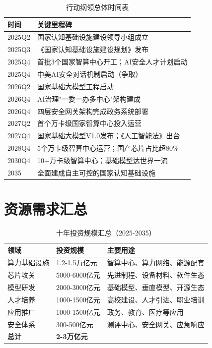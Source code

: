 \begin{table}[H]
\centering
\caption{行动纲领总体时间表}
\small
\begin{tabular}{p{2cm}p{10cm}}
\toprule
\textbf{时间} & \textbf{关键里程碑} \\
\midrule
2025Q2 & 国家认知基础设施建设领导小组成立 \\
2025Q3 & 《国家认知基础设施建设规划》发布 \\
2025Q4 & 首批3个国家智算中心开工；AI安全人才计划启动 \\
2025Q4 & 中美AI安全对话机制启动（争取） \\
2026Q2 & 国家基础大模型工程启动 \\
2026Q4 & AI治理"一委一办多中心"架构建成 \\
2026Q4 & 四层安全网关架构完成政务系统部署 \\
2027Q2 & 首个万卡级国家智算中心投入运营 \\
2027Q4 & 国家基础大模型V1.0发布；《人工智能法》出台 \\
2028Q4 & 5个万卡级智算中心运营；国产芯片占比超80\% \\
2030Q4 & 10+万卡级智算中心；基础模型达世界一流 \\
2035 & 全面建成自主可控的国家认知基础设施 \\
\bottomrule
\end{tabular}
\end{table}

\section{资源需求汇总}

\begin{table}[H]
\centering
\caption{十年投资规模汇总（2025-2035）}
\small
\begin{tabular}{p{4cm}p{3cm}p{5cm}}
\toprule
\textbf{领域} & \textbf{投资规模} & \textbf{主要用途} \\
\midrule
算力基础设施 & 1.2-1.5万亿元 & 智算中心、算力网络、能源配套 \\
芯片攻关 & 5000-6000亿元 & 先进制程、设备材料、软件生态 \\
模型研发 & 2000-3000亿元 & 基础模型、垂直模型、开源生态 \\
人才培养 & 1000-1500亿元 & 高校建设、人才引进、职业培训 \\
应用推广 & 1000-1500亿元 & 政务、教育、医疗等应用 \\
安全体系 & 300-500亿元 & 测评中心、安全网关、应急响应 \\
\midrule
\textbf{总计} & \textbf{2-3万亿元} & \\
\bottomrule
\end{tabular}
\end{table}

